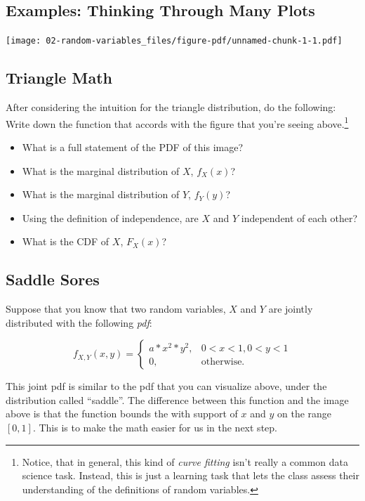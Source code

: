 \documentclass[
  letterpaper,
  DIV=11,
  numbers=noendperiod]{scrreprt}
\providecommand{\tightlist}{%
  \setlength{\itemsep}{0pt}\setlength{\parskip}{0pt}}\usepackage{longtable,booktabs,array}
\begin{document}
\subsection{Examples: Thinking Through Many
Plots}\label{examples-thinking-through-many-plots}

\texttt{[image: 02-random-variables\_files/figure-pdf/unnamed-chunk-1-1.pdf]}

\subsection{Triangle Math}\label{triangle-math}

After considering the intuition for the triangle distribution, do the
following: Write down the function that accords with the figure that
you're seeing above.\footnote{Notice, that in general, this kind of
  \emph{curve fitting} isn't really a common data science task. Instead,
  this is just a learning task that lets the class assess their
  understanding of the definitions of random variables.}

\begin{itemize}
\tightlist
\item
  What is a full statement of the PDF of this image?
\item
  What is the marginal distribution of \(X\), \(f_{X}(x)\)?
\item
  What is the marginal distribution of \(Y\), \(f_{Y}(y)\)?
\item
  Using the definition of independence, are \(X\) and \(Y\) independent
  of each other?
\item
  What is the CDF of \(X\), \(F_{X}(x)\)?
\end{itemize}

\subsection{Saddle Sores}\label{saddle-sores}

Suppose that you know that two random variables, \(X\) and \(Y\) are
jointly distributed with the following \emph{pdf}:

\[
f_{X,Y}(x,y) =
  \begin{cases}
    a * x^{2} * y^{2}, & 0 < x < 1, 0 < y < 1 \\
    0, & \text{otherwise.}
  \end{cases}
\]

This joint pdf is similar to the pdf that you can visualize above, under
the distribution called ``saddle''. The difference between this function
and the image above is that the function bounds the with support of
\(x\) and \(y\) on the range \([0,1]\). This is to make the math easier
for us in the next step.
\end{document}
